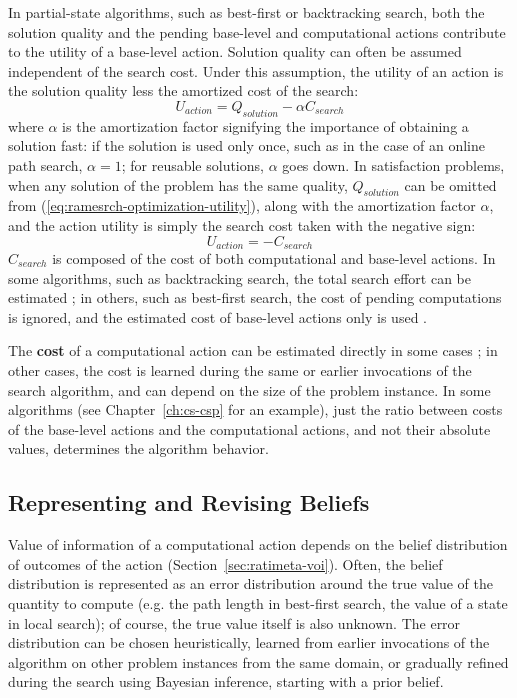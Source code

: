 In partial-state algorithms, such as best-first or backtracking
search, both the solution quality and the pending base-level and
computational actions contribute to the utility of a base-level
action. Solution quality can often be assumed independent of the
search cost. Under this assumption, the utility of an action is the solution quality
less the amortized cost of the search:
\begin{equation}
\label{eq:ramesrch-optimization-utility}
U_{action}=Q_{solution}-\alpha C_{search}
\end{equation} where $\alpha$ is the amortization factor signifying the
importance of obtaining a solution fast: if the solution is used only
once, such as in the case of an online path search, $\alpha=1$; for
reusable solutions, $\alpha$ goes down. In satisfaction problems, when
any solution of the problem has the same quality, $Q_{solution}$
can be omitted from (\ref{eq:ramesrch-optimization-utility}), along
with the amortization factor $\alpha$, and the action utility is
simply the search cost taken with the negative sign:
\begin{equation}
\label{eq:ramesrch-satisfaction-utility} U_{action}=-C_{search}
\end{equation} $C_{search}$ is composed of the cost of both
computational and base-level actions. In some algorithms, such as
backtracking search, the total search effort can be estimated
\cite{Knuth.backtrack}\cite{Refalo.impact}; in others, such as
best-first search, the cost of pending computations is ignored, and
the estimated cost of base-level actions only is used
\cite{Russell.right}.

The {\bf cost} of a computational action can be estimated directly in
some cases \cite{Russell.right}; in other cases, the cost is learned
during the same or earlier invocations of the search algorithm, and
can depend on the size of the problem instance. In some algorithms
(see Chapter~\ref{ch:cs-csp} for an example), just the ratio between
costs of the base-level actions and the computational actions, and not
their absolute values, determines the algorithm behavior.

\subsection{Representing and Revising Beliefs}

Value of information of a computational action depends on the belief
distribution of outcomes of the action
(Section~\ref{sec:ratimeta-voi}).  Often, the belief distribution is
represented as an error distribution around the true value of the
quantity to compute (e.g. the path length in best-first search, the
value of a state in local search); of course, the true value itself is
also unknown.  The error distribution can be chosen heuristically,
learned from earlier invocations of the algorithm on other problem
instances from the same domain, or gradually refined during the search
using Bayesian inference, starting with a prior belief.

